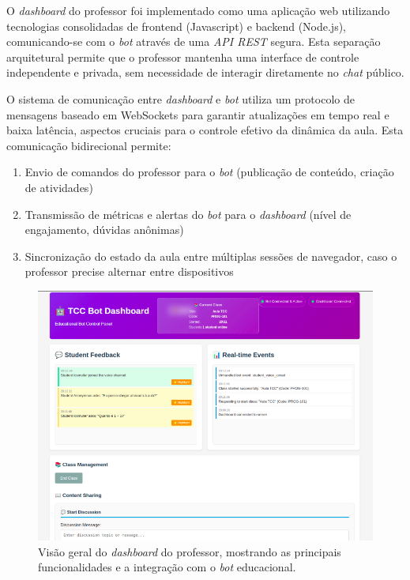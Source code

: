 O \textit{dashboard} do professor foi implementado como uma aplicação web
utilizando tecnologias consolidadas de frontend (Javascript) e backend (Node.js),
comunicando-se com o \textit{bot} através de uma \textit{API REST} segura. Esta
separação arquitetural permite que o professor mantenha uma interface de
controle independente e privada, sem necessidade de interagir diretamente no
\textit{chat} público.

O sistema de comunicação entre \textit{dashboard} e \textit{bot} utiliza um
protocolo de mensagens baseado em WebSockets para garantir atualizações em tempo
real e baixa latência, aspectos cruciais para o controle efetivo da dinâmica da
aula. Esta comunicação bidirecional permite:

\begin{enumerate}
\item Envio de comandos do professor para o \textit{bot} (publicação de
conteúdo, criação de atividades)
\item Transmissão de métricas e alertas do \textit{bot} para o
\textit{dashboard} (nível de engajamento, dúvidas anônimas)
\item Sincronização do estado da aula entre múltiplas sessões de navegador, caso
o professor precise alternar entre dispositivos
\end{enumerate}

\begin{figure}[H] \centering
\centering
\includegraphics[width=16cm]{dashboard-preview.png}
\caption{Visão geral do \textit{dashboard} do professor, mostrando as principais
funcionalidades e a integração com o \textit{bot} educacional.}
\label{fig:dashboard-preview}
\end{figure}


